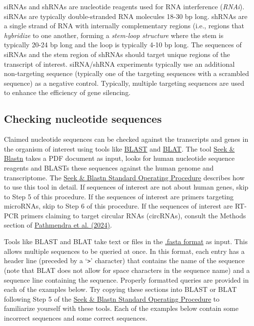 \documentclass[letterpaper, 12pt]{article}
\begin{document}
siRNAs and shRNAs are nucleotide reagents used for RNA interference (\emph{RNAi}). siRNAs are typically double-stranded RNA molecules 18-30 bp long. shRNAs are a single strand of RNA with internally complementary regions (i.e., regions that \emph{hybridize} to one another, forming a \emph{stem-loop structure} where the stem is typically 20-24 bp long and the loop is typically 4-10 bp long. The sequences of siRNAs and the stem region of shRNAs should target unique regions of the transcript of interest. siRNA/shRNA experiments typically use an additional non-targeting sequence (typically one of the targeting sequences with a scrambled sequence) as a negative control. Typically, multiple targeting sequences are used to enhance the efficiency of gene silencing.

\subsection*{Checking nucleotide sequences}

Claimed nucleotide sequences can be checked against the transcripts and genes in the organism of interest using tools like \href{https://blast.ncbi.nlm.nih.gov/Blast.cgi?PROGRAM=blastn}{BLAST} and \href{https://genome.ucsc.edu/cgi-bin/hgBlat}{BLAT}. The tool \href{https://blast.ncbi.nlm.nih.gov/Blast.cgi?PROGRAM=blastn}{Seek \& Blastn} takes a PDF document as input, looks for human nucleotide sequence reagents and BLASTs these sequences against the human genome and transcriptome. The \href{https://dx.doi.org/10.17504/protocols.io.bjhpkj5n}{Seek \& Blastn Standard Operating Procedure} describes how to use this tool in detail. If sequences of interest are not about human genes, skip to Step 5 of this procedure. If the sequences of interest are primers targeting microRNAs, skip to Step 6 of this procedure. If the sequences of interest are RT-PCR primers claiming to target circular RNAs (circRNAs), consult the Methods section of \href{https://doi.org/10.1007/s00210-023-02846-2}{Pathmendra et al. (2024)}.

Tools like BLAST and BLAT take text or files in the \href{https://en.wikipedia.org/wiki/FASTA_format}{.fasta format} as input. This allows multiple sequences to be queried at once. In this format, each entry has a header line (preceded by a `\verb|>|' character) that contains the name of the sequence (note that BLAT does not allow for space characters in the sequence name) and a sequence line containing the sequence. Properly formatted queries are provided in each of the examples below. Try copying these sections into BLAST or BLAT following Step 5 of the \href{https://dx.doi.org/10.17504/protocols.io.bjhpkj5n}{Seek \& Blastn Standard Operating Procedure} to familiarize yourself with these tools. Each of the examples below contain some incorrect sequences and some correct sequences.
\end{document}
